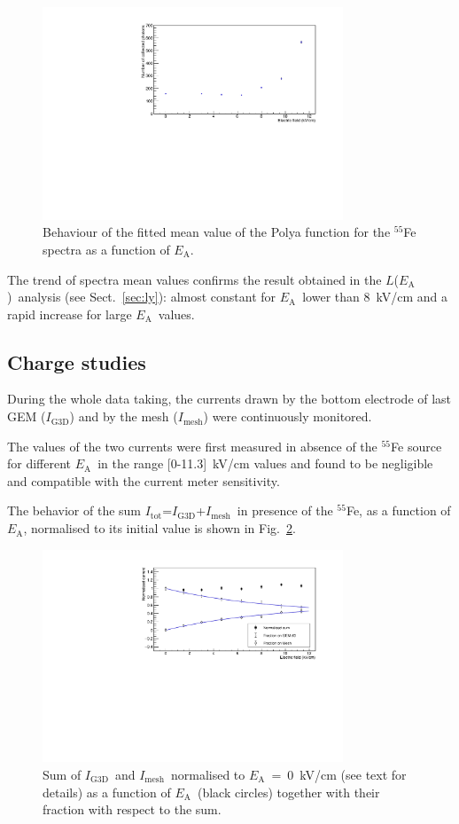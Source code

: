 \documentclass[a4paper,11pt]{article}
\newcommand{\Itot}{$I_{\mathrm{tot}}$}
\newcommand{\Ig}  {$I_{\mathrm{G3D}}$}
\newcommand{\Ime}  {$I_{\mathrm{mesh}}$}
\newcommand{\Ea}  {$E_{\mathrm{A}}$}
\newcommand{\La}  {$L$(\Ea)}
\begin{document}
\begin{figure}[ht]
\centering
\includegraphics[width=0.80\textwidth]{gqIn_corr.pdf}
\caption{Behaviour of the fitted mean value of the Polya function for the
$^{55}$Fe spectra as a 
function of \Ea.} 
\label{fig:qIn2}
\end{figure}

The trend of spectra mean values confirms the result obtained in the \La\ analysis (see Sect.~\ref{sec:ly}): almost constant for \Ea\ lower than 8~kV/cm and a rapid increase for large \Ea\ values.

\subsection{Charge studies}

During the whole data taking, the currents drawn by the bottom electrode of last GEM (\Ig) and by the mesh (\Ime) were continuously monitored. 

The values of the two currents were first measured in absence of the $^{55}$Fe source for different \Ea\ in the range [0-11.3]~kV/cm values and found to be negligible and compatible with the current meter sensitivity.

The behavior of the sum \Itot=\Ig +\Ime\ in presence of the $^{55}$Fe, as a function of 
\Ea, normalised to its initial value is shown in Fig.~\ref{fig:currents}.

\begin{figure}[ht]
\centering
\includegraphics[width=0.80\textwidth]{currents.pdf}
\caption{Sum of \Ig\ and \Ime\ normalised to \Ea~=~0~kV/cm (see text for details) as a function of \Ea\  (black circles) together with their 
fraction with respect to the sum.} 
\label{fig:currents}
\end{figure}
\end{document}
